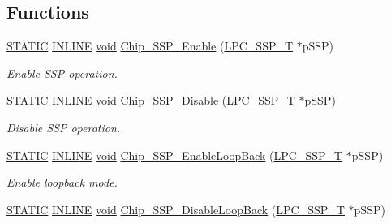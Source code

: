\subsection*{Functions}
\begin{DoxyCompactItemize}
\item 
\hyperlink{group__LPC__Types__Public__Macros_ga10b2d890d871e1489bb02b7e70d9bdfb}{S\-T\-A\-T\-I\-C} \hyperlink{group__LPC__Types__Public__Types_ga2eb6f9e0395b47b8d5e3eeae4fe0c116}{I\-N\-L\-I\-N\-E} \hyperlink{Paradigm_2Tern__EE_2small_2portmacro_8h_a14d32f8130d3c0b212cfc751730b5b49}{void} \hyperlink{group__SSP__17XX__40XX_gaf49b9a4689c9ae39bbd8c1ac20d31073}{Chip\-\_\-\-S\-S\-P\-\_\-\-Enable} (\hyperlink{structLPC__SSP__T}{L\-P\-C\-\_\-\-S\-S\-P\-\_\-\-T} $\ast$p\-S\-S\-P)
\begin{DoxyCompactList}\small\item\em Enable S\-S\-P operation. \end{DoxyCompactList}\item 
\hyperlink{group__LPC__Types__Public__Macros_ga10b2d890d871e1489bb02b7e70d9bdfb}{S\-T\-A\-T\-I\-C} \hyperlink{group__LPC__Types__Public__Types_ga2eb6f9e0395b47b8d5e3eeae4fe0c116}{I\-N\-L\-I\-N\-E} \hyperlink{Paradigm_2Tern__EE_2small_2portmacro_8h_a14d32f8130d3c0b212cfc751730b5b49}{void} \hyperlink{group__SSP__17XX__40XX_ga3033c296868595a01dd74ecccaed6090}{Chip\-\_\-\-S\-S\-P\-\_\-\-Disable} (\hyperlink{structLPC__SSP__T}{L\-P\-C\-\_\-\-S\-S\-P\-\_\-\-T} $\ast$p\-S\-S\-P)
\begin{DoxyCompactList}\small\item\em Disable S\-S\-P operation. \end{DoxyCompactList}\item 
\hyperlink{group__LPC__Types__Public__Macros_ga10b2d890d871e1489bb02b7e70d9bdfb}{S\-T\-A\-T\-I\-C} \hyperlink{group__LPC__Types__Public__Types_ga2eb6f9e0395b47b8d5e3eeae4fe0c116}{I\-N\-L\-I\-N\-E} \hyperlink{Paradigm_2Tern__EE_2small_2portmacro_8h_a14d32f8130d3c0b212cfc751730b5b49}{void} \hyperlink{group__SSP__17XX__40XX_ga8683ccce6ba5578103efcb791f39cff8}{Chip\-\_\-\-S\-S\-P\-\_\-\-Enable\-Loop\-Back} (\hyperlink{structLPC__SSP__T}{L\-P\-C\-\_\-\-S\-S\-P\-\_\-\-T} $\ast$p\-S\-S\-P)
\begin{DoxyCompactList}\small\item\em Enable loopback mode. \end{DoxyCompactList}\item 
\hyperlink{group__LPC__Types__Public__Macros_ga10b2d890d871e1489bb02b7e70d9bdfb}{S\-T\-A\-T\-I\-C} \hyperlink{group__LPC__Types__Public__Types_ga2eb6f9e0395b47b8d5e3eeae4fe0c116}{I\-N\-L\-I\-N\-E} \hyperlink{Paradigm_2Tern__EE_2small_2portmacro_8h_a14d32f8130d3c0b212cfc751730b5b49}{void} \hyperlink{group__SSP__17XX__40XX_gaa733ed4b0773cda022ad87ff41304c40}{Chip\-\_\-\-S\-S\-P\-\_\-\-Disable\-Loop\-Back} (\hyperlink{structLPC__SSP__T}{L\-P\-C\-\_\-\-S\-S\-P\-\_\-\-T} $\ast$p\-S\-S\-P)

\end{DoxyCompactItemize}
